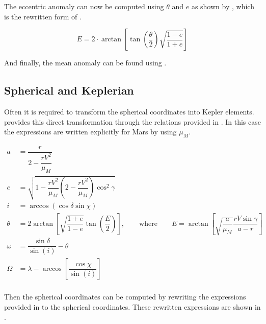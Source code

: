 The eccentric anomaly can now be computed using $\theta$ and $e$ as shown by , which is the rewritten form of .

\begin{equation}\label{eq:ecc}
E=2\cdot\arctan\left[\tan\left(\dfrac{\theta}{2}\right)\sqrt{\dfrac{1-e}{1+e}}\right]
\end{equation}

And finally, the mean anomaly can be found using \citep{noomen2013basic}.



\subsection{Spherical and Keplerian}
\label{subsec:spherkepl}
Often it is required to transform the spherical coordinates into Kepler elements. \cite{wakker2010astro1} provides this direct transformation through the relations provided in . In this case the expressions are written explicitly for Mars by using $\mu_{M}$.


\begin{equation} \label{eq:sphertokepl}
\begin{split}
a&=\dfrac{r}{2-\dfrac{rV^{2}}{\mu_{M}}}\\
e&=\sqrt{1-\dfrac{rV^{2}}{\mu_{M}}\left(2-\dfrac{rV^{2}}{\mu_{M}}\right)\cos^{2}\gamma }\\
i&=\arccos\left(\cos\delta \sin\chi \right)\\
\theta&=2\arctan\left[\sqrt{\dfrac{1+e}{1-e}}\tan\left(\dfrac{E}{2}\right)\right], \qquad \text{where} \qquad E=\arctan\left[\sqrt{\dfrac{a}{\mu_{M}}}\dfrac{rV\sin\gamma }{a-r}\right] \\
\omega&=\dfrac{\sin\delta }{\sin\left(i\right)}-\theta\\
\Omega&=\lambda-\arccos\left[\dfrac{\cos\chi }{\sin\left(i\right)}\right]\\
\end{split}
\end{equation}   

Then the spherical coordinates can be computed by rewriting the expressions provided in  to the spherical coordinates. These rewritten expressions are shown in . 

